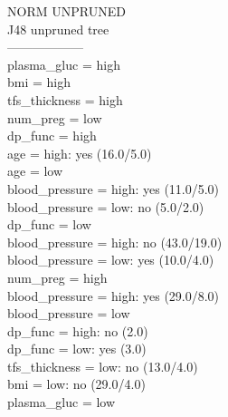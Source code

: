 \documentclass[12pt]{article}
\begin{document}
NORM UNPRUNED \\
J48 unpruned tree \\
------------------ \\
plasma\_gluc = high \\
\textbar\quad   bmi = high \\
\textbar\quad   \textbar\quad   tfs\_thickness = high \\
\textbar\quad   \textbar\quad   \textbar\quad   num\_preg = low \\
\textbar\quad   \textbar\quad   \textbar\quad   \textbar\quad   dp\_func = high \\
\textbar\quad   \textbar\quad   \textbar\quad   \textbar\quad   \textbar\quad   age = high: yes (16.0/5.0) \\
\textbar\quad   \textbar\quad   \textbar\quad   \textbar\quad   \textbar\quad   age = low \\
\textbar\quad   \textbar\quad   \textbar\quad   \textbar\quad   \textbar\quad   \textbar\quad   blood\_pressure = high: yes (11.0/5.0) \\
\textbar\quad   \textbar\quad   \textbar\quad   \textbar\quad   \textbar\quad   \textbar\quad   blood\_pressure = low: no (5.0/2.0) \\
\textbar\quad   \textbar\quad   \textbar\quad   \textbar\quad   dp\_func = low\\
\textbar\quad   \textbar\quad   \textbar\quad   \textbar\quad   \textbar\quad   blood\_pressure = high: no (43.0/19.0)\\
\textbar\quad   \textbar\quad   \textbar\quad   \textbar\quad   \textbar\quad   blood\_pressure = low: yes (10.0/4.0) \\
\textbar\quad   \textbar\quad   \textbar\quad   num\_preg = high \\
\textbar\quad   \textbar\quad   \textbar\quad   \textbar\quad   blood\_pressure = high: yes (29.0/8.0)\\
\textbar\quad   \textbar\quad   \textbar\quad   \textbar\quad   blood\_pressure = low\\
\textbar\quad   \textbar\quad   \textbar\quad   \textbar\quad   \textbar\quad   dp\_func = high: no (2.0)\\
\textbar\quad   \textbar\quad   \textbar\quad   \textbar\quad   \textbar\quad   dp\_func = low: yes (3.0)\\
\textbar\quad   \textbar\quad   tfs\_thickness = low: no (13.0/4.0)\\
\textbar\quad   bmi = low: no (29.0/4.0)\\
plasma\_gluc = low \\
\end{document}

